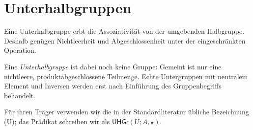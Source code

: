 \documentclass[main.tex]{subfiles}
\begin{document}
\section{Unterhalbgruppen}

Eine Unterhalbgruppe erbt die Assoziativit\"at von der umgebenden
Halbgruppe. Deshalb gen\"ugen Nichtleerheit und Abgeschlossenheit unter der
eingeschr\"ankten Operation.

Eine \emph{Unterhalbgruppe} ist dabei noch keine Gruppe: Gemeint ist nur
eine nichtleere, produktabgeschlossene Teilmenge. Echte Untergruppen mit
neutralem Element und Inversen werden erst nach Einführung des
Gruppenbegriffs behandelt.

Für ihren Träger verwenden wir die in der Standardliteratur übliche
Bezeichnung (U); das Prädikat schreiben wir als
\(\mathsf{UHGr}(U;A,\star)\).

\par\noindent\begin{minipage}{\linewidth}
\end{minipage}\par

\par\noindent\begin{minipage}{\linewidth}
\end{minipage}\par

\par\noindent\begin{minipage}{\linewidth}
\end{minipage}\par
\end{document}
